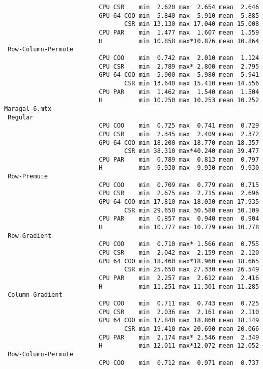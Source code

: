 \begin{verbatim}
                          CPU CSR    min  2.620 max  2.654 mean  2.646
                          GPU 64 COO min  5.840 max  5.910 mean  5.885
                                 CSR min 13.130 max 17.040 mean 15.008
                          CPU PAR    min  1.477 max  1.607 mean  1.559
                          H          min 10.858 max*10.876 mean 10.864
 Row-Column-Permute
                          CPU COO    min  0.742 max  2.010 mean  1.124
                          CPU CSR    min  2.789 max* 2.800 mean  2.795
                          GPU 64 COO min  5.900 max  5.980 mean  5.941
                                 CSR min 13.640 max 15.410 mean 14.556
                          CPU PAR    min  1.462 max  1.540 mean  1.504
                          H          min 10.250 max 10.253 mean 10.252
Maragal_6.mtx
 Regular
                          CPU COO    min  0.725 max  0.741 mean  0.729
                          CPU CSR    min  2.345 max  2.409 mean  2.372
                          GPU 64 COO min 18.200 max 18.770 mean 18.357
                                 CSR min 38.310 max*40.240 mean 39.477
                          CPU PAR    min  0.789 max  0.813 mean  0.797
                          H          min  9.930 max  9.930 mean  9.930
 Row-Premute
                          CPU COO    min  0.709 max  0.779 mean  0.715
                          CPU CSR    min  2.675 max  2.715 mean  2.696
                          GPU 64 COO min 17.810 max 18.030 mean 17.935
                                 CSR min 29.650 max 30.580 mean 30.109
                          CPU PAR    min  0.857 max  0.940 mean  0.904
                          H          min 10.777 max 10.779 mean 10.778
 Row-Gradient
                          CPU COO    min  0.710 max* 1.566 mean  0.755
                          CPU CSR    min  2.042 max  2.159 mean  2.120
                          GPU 64 COO min 18.460 max*18.960 mean 18.665
                                 CSR min 25.650 max 27.330 mean 26.549
                          CPU PAR    min  2.257 max  2.612 mean  2.416
                          H          min 11.251 max 11.301 mean 11.285
 Column-Gradient
                          CPU COO    min  0.711 max  0.743 mean  0.725
                          CPU CSR    min  2.036 max  2.161 mean  2.110
                          GPU 64 COO min 17.840 max 18.860 mean 18.149
                                 CSR min 19.410 max 20.690 mean 20.066
                          CPU PAR    min  2.174 max* 2.546 mean  2.349
                          H          min 12.011 max*12.072 mean 12.052
 Row-Column-Permute
                          CPU COO    min  0.712 max  0.971 mean  0.737

\end{verbatim}
